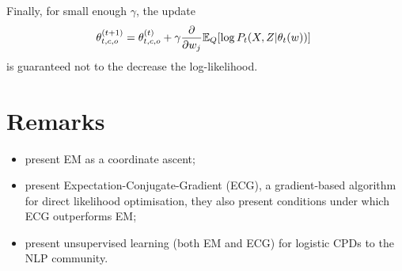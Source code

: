 Finally, for small enough $\gamma$, the update
\begin{equation}
	\theta^{(t+1)}_{t,c,o} = \theta^{(t)}_{t,c,o} + \gamma \frac{\partial}{\partial w_j} \mathbb E_Q[\log P_t(X, Z|\theta_t(w))] ~
\end{equation}
is guaranteed not to the decrease the log-likelihood.

\section{Remarks}

\begin{itemize}
	\item \citet{Neal+1998:EM} present EM as a coordinate ascent;
	\item \citet{Salakhutdinov+2003:ECG} present Expectation-Conjugate-Gradient (ECG), a gradient-based algorithm for direct likelihood optimisation, they also present conditions under which ECG  outperforms EM;
	\item \citet{Berg+2010:PU} present unsupervised learning (both EM and ECG) for logistic CPDs to the NLP community.
\end{itemize}